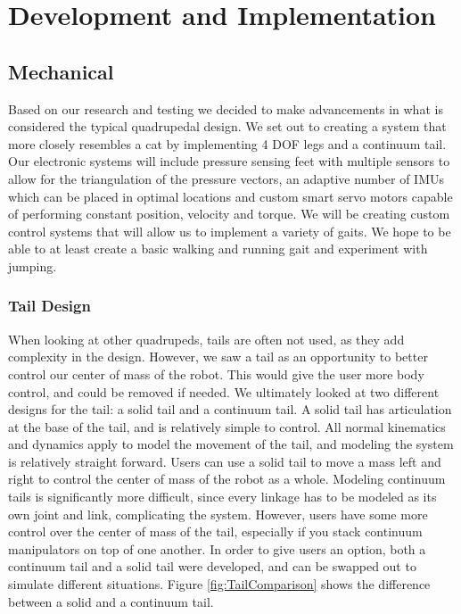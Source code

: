 \section{Development and Implementation}
       

\subsection{Mechanical}
 Based on our research and testing we decided to make advancements in what is considered the typical quadrupedal design. We set out to creating a system that more closely resembles a cat by implementing 4 DOF legs and a continuum tail. Our electronic systems will include pressure sensing feet with multiple sensors to allow for the triangulation of the pressure vectors, an adaptive number of IMUs which can be placed in optimal locations and custom smart servo motors capable of performing constant position, velocity and torque. We will be creating custom control systems that will allow us to implement a variety of gaits. We hope to be able to at least create a basic walking and running gait and experiment with jumping.

        \subsubsection{Tail Design}
            When looking at other quadrupeds, tails are often not used, as they add complexity in the design. However, we saw a tail as an opportunity to better control our center of mass of the robot. This would give the user more body control, and could be removed if needed. We ultimately looked at two different designs for the tail: a solid tail and a continuum tail. A solid tail has articulation at the base of the tail, and is relatively simple to control. All normal kinematics and dynamics apply to model the movement of the tail, and modeling the system is relatively straight forward. Users can use a solid tail to move a mass left and right to control the center of mass of the robot as a whole. Modeling continuum tails is significantly more difficult, since every linkage has to be modeled as its own joint and link, complicating the system. However, users have some more control over the center of mass of the tail, especially if you stack continuum manipulators on top of one another. In order to give users an option, both a continuum tail and a solid tail were developed, and can be swapped out to simulate different situations. Figure \ref{fig:TailComparison} shows the difference between a solid and a continuum tail.
            
